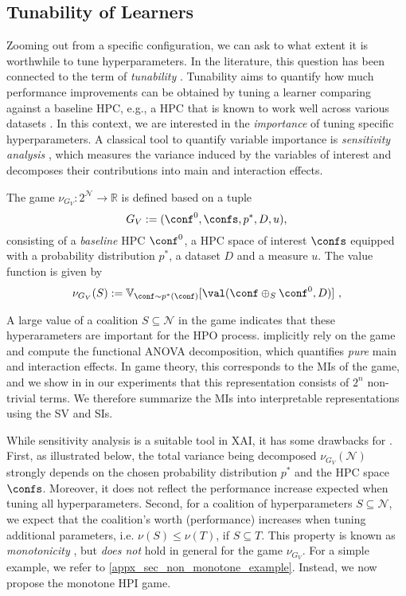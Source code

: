 \subsection{Tunability of Learners}\label{sec:sensitivity-tunability}
Zooming out from a specific configuration, we can ask to what extent it is worthwhile to tune hyperparameters. 
In the literature, this question has been connected to the term of \textit{tunability} \citep{tunability}. 
Tunability aims to quantify how much performance improvements can be obtained by tuning a learner comparing against a baseline HPC, e.g., a HPC that is known to work well across various datasets \citep{DBLP:conf/gecco/PushakH20a}.
In this context, we are interested in the \emph{importance} of tuning specific hyperparameters.
A classical tool to quantify variable importance is \emph{sensitivity analysis} \citep{Owen_2013}, which measures the variance induced by the variables of interest and decomposes their contributions into main and interaction effects.

\begin{definition}
The \sensitivity game $\nu_{G_V}: 2^{\mathcal N} \to \mathbb{R}$ is defined based on a tuple
\[
    G_V := (\conf^0, \confs, p^*, D, u),
\]
consisting of a \emph{baseline} HPC $\conf^0$, a HPC space of interest $\confs$ equipped with a probability distribution $p^*$, a dataset $D$ and a measure $u$. 
The value function is given by
\[
    \nu_{G_V}(S) := \mathbb{V}_{\conf \sim p^\ast(\conf)}[\val(\conf \oplus_S \conf^0, D)] \,\, ,
\] 
\end{definition}

A large value of a coalition $S \subseteq \mathcal N$ in the \sensitivity game indicates that these hyperarameters are important for the HPO process.
\citet{fANOVA} implicitly rely on the \sensitivity game and compute the functional ANOVA decomposition, which quantifies \emph{pure} main and interaction effects.
In game theory, this corresponds to the \glspl*{MI} of the \sensitivity game, and we show in in our experiments that this representation consists of $2^n$ non-trivial terms.
We therefore summarize the \glspl*{MI} into interpretable representations using the \gls*{SV} and \glspl*{SI}.

While sensitivity analysis is a suitable tool in XAI, it has some drawbacks for \tunability.
First, as illustrated below, the total variance being decomposed $\nu_{G_V}(\mathcal N)$ strongly depends on the chosen probability distribution $p^*$ and the HPC space $\confs$.
Moreover, it does not reflect the performance increase expected when tuning all hyperparameters.
Second, for a coalition of hyperparameters $S \subseteq \mathcal N$, we expect that the coalition's worth (performance) increases when tuning additional parameters, i.e. $\nu(S) \leq  \nu(T)$, if $S \subseteq T$.
This property is known as \emph{monotonicity} \citep{Fujimoto.2006}, but \emph{does not} hold in general for the \sensitivity game $\nu_{G_V}$.
For a simple example, we refer to \cref{appx_sec_non_monotone_example}.
Instead, we now propose the monotone HPI \tunability game.

